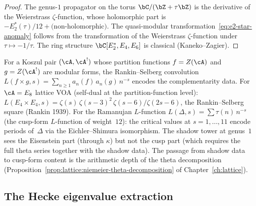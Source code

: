 \begin{proof}
The genus-$1$ propagator on the torus $\bC/(\bZ + \tau\bZ)$
is the derivative of the Weierstrass $\zeta$-function,
whose holomorphic part is
$-E_2^*(\tau)/12 + \text{(non-holomorphic)}$.
The quasi-modular transformation~\eqref{eq:e2-star-anomaly}
follows from the transformation of the Weierstrass
$\zeta$-function under $\tau \mapsto -1/\tau$.
The ring structure $\bC[E_2^*, E_4, E_6]$ is classical
(Kaneko--Zagier).
\end{proof}

\begin{remark}%
\label{rem:l-functions-koszul-pairs}%
%
%
For a Koszul pair $(\cA, \cA^!)$ whose partition functions
$f = Z(\cA)$ and $g = Z(\cA^!)$ are modular forms, the
Rankin--Selberg convolution
$L(f \times g, s) = \sum_{n \geq 1} a_n(f)\,a_n(g)\,n^{-s}$
encodes the complementarity data.
For $\cA = E_8$ lattice VOA (self-dual at the partition-function
level): $L(E_4 \times E_4, s) =
\zeta(s)\,\zeta(s{-}3)^2\,\zeta(s{-}6)/\zeta(2s{-}6)$,
the Rankin--Selberg square (Rankin 1939).
For the Ramanujan $L$-function $L(\Delta, s)
= \sum \tau(n)\,n^{-s}$ (the cusp-form $L$-function
of weight~$12$): the critical values at $s = 1, \ldots, 11$
encode periods of~$\Delta$ via the Eichler--Shimura isomorphism.
The shadow tower at genus~$1$ sees the Eisenstein part
(through $\kappa$) but not the cusp part (which requires
the full theta series together with the shadow data).
The passage from shadow data to cusp-form content is the
arithmetic depth of the theta decomposition
(Proposition~\ref{prop:lattice:niemeier-theta-decomposition}
of Chapter~\ref{ch:lattice}).
\end{remark}

\subsection{The Hecke eigenvalue extraction}%
\label{subsec:hecke-eigenvalue-extraction}%

